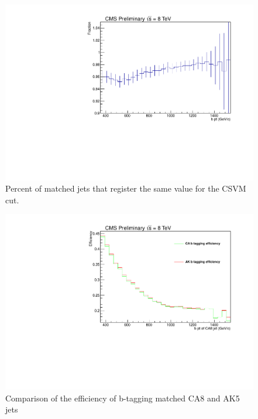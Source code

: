 \begin{figure}[Htcb]
\centering
\includegraphics[width=1.0\textwidth]{AN-13-004/figs/bpercentr32700.pdf}
\caption{Percent of matched jets that register the same value for the CSVM cut.}
\label{figs:bpercent}
\end{figure}

\begin{figure}[Htcb]
\centering
\includegraphics[width=1.0\textwidth]{AN-13-004/figs/beffCAptr32700.pdf}
\caption{Comparison of the efficiency of b-tagging matched CA8 and AK5 jets}
\label{figs:beff}
\end{figure}



